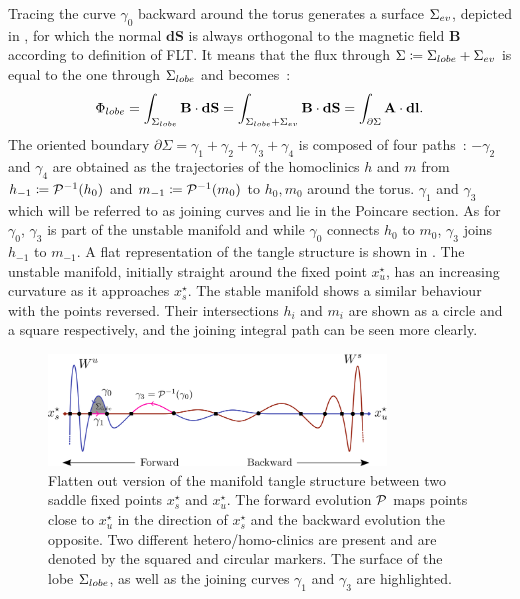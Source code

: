 Tracing the curve $\gamma_0$ backward around the torus generates a surface $\Sigma_{ev}$, depicted in , for which the normal $\textbf{dS}$ is always orthogonal to the magnetic field $\textbf{B}$ according to definition of FLT. It means that the flux through $\Sigma \coloneqq \Sigma_{lobe}+\Sigma_{ev}$ is equal to the one through $\Sigma_{lobe}$ and  becomes~:
\begin{equation}\label{eq:contour-2}
    \Phi_{lobe} =  \int_{\Sigma_{lobe}} \textbf{B}\cdot\textbf{dS} = \int_{\Sigma_{lobe}+\Sigma_{ev}} \textbf{B}\cdot\textbf{dS} = \int_{\partial\Sigma} \textbf{A}\cdot \textbf{dl}.
\end{equation}
The oriented boundary $\partial\Sigma = \gamma_1 + \gamma_2 + \gamma_3 + \gamma_4$ is composed of four paths~: $-\gamma_2$ and $\gamma_4$ are obtained as the trajectories of the homoclinics $h$ and $m$ from $h_{-1}\coloneqq\mathcal{P}^{-1}(h_0)$ and $m_{-1}\coloneqq\mathcal{P}^{-1}(m_0)$ to $h_{0}, m_{0}$ around the torus. $\gamma_1$ and $\gamma_3$ which will be referred to as joining curves and lie in the Poincare section. As for $\gamma_0$, $\gamma_3$ is part of the unstable manifold and while $\gamma_0$ connects $h_0$ to $m_0$, $\gamma_3$ joins $h_{-1}$ to $m_{-1}$. A flat representation of the tangle structure is shown in . The unstable manifold, initially straight around the fixed point $x_u^\star$, has an increasing curvature as it approaches $x_s^\star$. The stable manifold shows a similar behaviour with the points reversed. Their intersections $h_i$ and $m_i$ are shown as a circle and a square respectively, and the joining integral path can be seen more clearly.

\begin{figure}[H]
    \centering
    \includegraphics[width=0.8\textwidth]{images/turnstile/line_tangle.png}
    \vspace{10px}
    \caption{Flatten out version of the manifold tangle structure between two saddle fixed points $x_s^\star$ and $x_u^\star$. The forward evolution $\mathcal{P}$ maps points close to $x_u^\star$ in the direction of $x_s^\star$ and the backward evolution the opposite. Two different hetero/homo-clinics are present and are denoted by the squared and circular markers. The surface of the lobe $\Sigma_{lobe}$, as well as the joining curves $\gamma_1$ and $\gamma_3$ are highlighted.}
    \label{fig:flat-tangle}
\end{figure}

